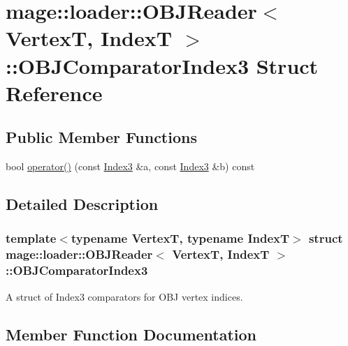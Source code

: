 \hypertarget{structmage_1_1loader_1_1_o_b_j_reader_1_1_o_b_j_comparator_index3}{}\section{mage\+:\+:loader\+:\+:O\+B\+J\+Reader$<$ VertexT, IndexT $>$\+:\+:O\+B\+J\+Comparator\+Index3 Struct Reference}
\label{structmage_1_1loader_1_1_o_b_j_reader_1_1_o_b_j_comparator_index3}
\subsection*{Public Member Functions}
\begin{DoxyCompactItemize}
\item 
bool \hyperlink{structmage_1_1loader_1_1_o_b_j_reader_1_1_o_b_j_comparator_index3_a11cacf5d6f2b4d342be22640fbefee0e}{operator()} (const \hyperlink{classmage_1_1loader_1_1_o_b_j_reader_af9aab131e88c5a3a0f29b156c4c97096}{Index3} \&a, const \hyperlink{classmage_1_1loader_1_1_o_b_j_reader_af9aab131e88c5a3a0f29b156c4c97096}{Index3} \&b) const
\end{DoxyCompactItemize}


\subsection{Detailed Description}
\subsubsection*{template$<$typename VertexT, typename IndexT$>$\newline
struct mage\+::loader\+::\+O\+B\+J\+Reader$<$ Vertex\+T, Index\+T $>$\+::\+O\+B\+J\+Comparator\+Index3}

A struct of {\ttfamily Index3} comparators for O\+BJ vertex indices. 

\subsection{Member Function Documentation}
\hypertarget{structmage_1_1loader_1_1_o_b_j_reader_1_1_o_b_j_comparator_index3_a11cacf5d6f2b4d342be22640fbefee0e}{}\label{structmage_1_1loader_1_1_o_b_j_reader_1_1_o_b_j_comparator_index3_a11cacf5d6f2b4d342be22640fbefee0e} 
